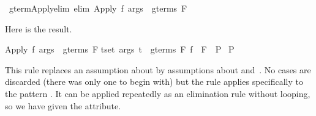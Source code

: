 \begin{isabellebody}
\isamarkuptrue%
\isamarkupfalse%
\ gterm{}Apply{}elim\ {}elim{}{}{}\ {}Apply\ f\ args\ {}\ gterms\ F{}%
\begin{isamarkuptext}%
Here is the result.
\begin{isabelle}%
{}Apply\ f\ args\ {}\ gterms\ F{}\isanewline
{}t{}set\ args{}\ t\ {}\ gterms\ F{}\ f\ {}\ F{}\ {}\ P{}\isanewline
{}\ P%
\end{isabelle}
This rule replaces an assumption about  by 
assumptions about  and~.  
No cases are discarded (there was only one to begin
with) but the rule applies specifically to the pattern .
It can be applied repeatedly as an elimination rule without looping, so we
have given the  attribute. 


\end{isamarkuptext}
\end{isabellebody}
